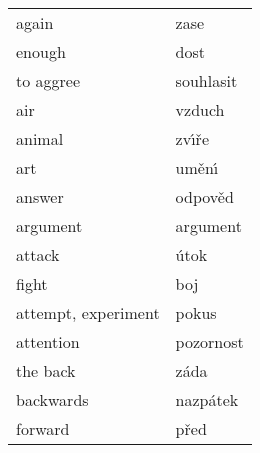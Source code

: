 \documentclass[11pt]{article}
\begin{document}
\begin{longtable}{ll}
 again                 &  zase            \\
 enough                &  dost            \\
 to aggree             &  souhlasit       \\
 air                   &  vzduch          \\
 animal                &  zv\'\i\v re     \\
 art                   &  um\v en\'\i     \\
 answer                &  odpov\v ed      \\
 argument              &  argument        \\
 attack                &  \'utok          \\
 fight                 &  boj             \\
 attempt, experiment   &  pokus           \\
 attention             &  pozornost       \\
 the back              &  z\'ada          \\
 backwards             &  nazp\'atek      \\
 forward               &  p\v red         \\
\end{longtable}
\end{document}
